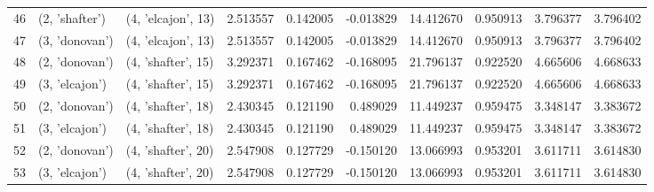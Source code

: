 \begin{tabular}{lllrrrrrrr}
46 &   (2, 'shafter') &  (4, 'elcajon', 13) &  2.513557 &  0.142005 & -0.013829 &  14.412670 &  0.950913 &  3.796377 &  3.796402 \\
47 &   (3, 'donovan') &  (4, 'elcajon', 13) &  2.513557 &  0.142005 & -0.013829 &  14.412670 &  0.950913 &  3.796377 &  3.796402 \\
48 &   (2, 'donovan') &  (4, 'shafter', 15) &  3.292371 &  0.167462 & -0.168095 &  21.796137 &  0.922520 &  4.665606 &  4.668633 \\
49 &   (3, 'elcajon') &  (4, 'shafter', 15) &  3.292371 &  0.167462 & -0.168095 &  21.796137 &  0.922520 &  4.665606 &  4.668633 \\
50 &   (2, 'donovan') &  (4, 'shafter', 18) &  2.430345 &  0.121190 &  0.489029 &  11.449237 &  0.959475 &  3.348147 &  3.383672 \\
51 &   (3, 'elcajon') &  (4, 'shafter', 18) &  2.430345 &  0.121190 &  0.489029 &  11.449237 &  0.959475 &  3.348147 &  3.383672 \\
52 &   (2, 'donovan') &  (4, 'shafter', 20) &  2.547908 &  0.127729 & -0.150120 &  13.066993 &  0.953201 &  3.611711 &  3.614830 \\
53 &   (3, 'elcajon') &  (4, 'shafter', 20) &  2.547908 &  0.127729 & -0.150120 &  13.066993 &  0.953201 &  3.611711 &  3.614830 \\
\bottomrule
\end{tabular}
